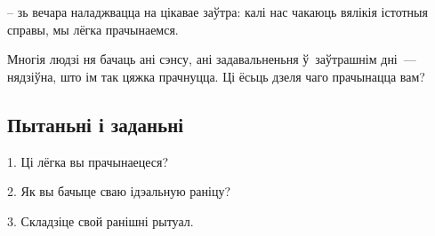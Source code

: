 – зь вечара наладжвацца на цікавае заўтра: калі нас чакаюць вялікія істотныя справы, мы лёгка прачынаемся.

Многія людзі ня бачаць ані сэнсу, ані задавальненьня ў~заўтрашнім дні~--- нядзіўна, што ім так цяжка прачнуцца. Ці ёсьць дзеля чаго прачынацца вам?

\subsection*{Пытаньні і заданьні}

1. Ці лёгка вы прачынаецеся?

2. Як вы бачыце сваю ідэальную раніцу?

3. Складзіце свой ранішні рытуал.

